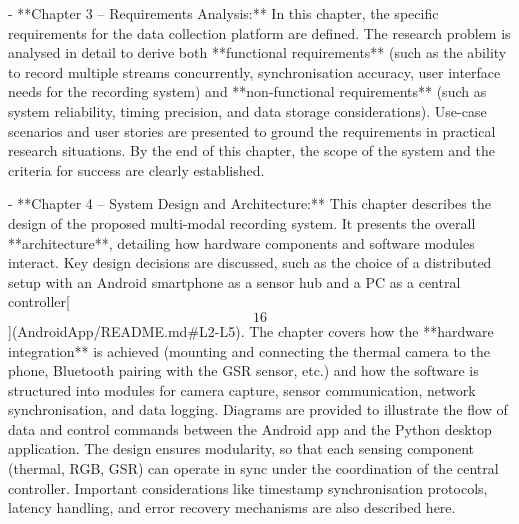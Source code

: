\documentclass[12pt,a4paper]{article}
\begin{document}
- **Chapter 3 -- Requirements Analysis:** In this chapter, the specific
  requirements for the data collection platform are defined. The
  research problem is analysed in detail to derive both **functional
  requirements** (such as the ability to record multiple streams
  concurrently, synchronisation accuracy, user interface needs for the
  recording system) and **non-functional requirements** (such as system
  reliability, timing precision, and data storage considerations).
  Use-case scenarios and user stories are presented to ground the
  requirements in practical research situations. By the end of this
  chapter, the scope of the system and the criteria for success are
  clearly established.

- **Chapter 4 -- System Design and Architecture:** This chapter
  describes the design of the proposed multi-modal recording system. It
  presents the overall **architecture**, detailing how hardware
  components and software modules interact. Key design decisions are
  discussed, such as the choice of a distributed setup with an Android
  smartphone as a sensor hub and a PC as a central
  controller[\[16\]](AndroidApp/README.md#L2-L5).
  The chapter covers how the **hardware integration** is achieved
  (mounting and connecting the thermal camera to the phone, Bluetooth
  pairing with the GSR sensor, etc.) and how the software is structured
  into modules for camera capture, sensor communication, network
  synchronisation, and data logging. Diagrams are provided to illustrate
  the flow of data and control commands between the Android app and the
  Python desktop application. The design ensures modularity, so that
  each sensing component (thermal, RGB, GSR) can operate in sync under
  the coordination of the central controller. Important considerations
  like timestamp synchronisation protocols, latency handling, and error
  recovery mechanisms are also described here.
\end{document}
